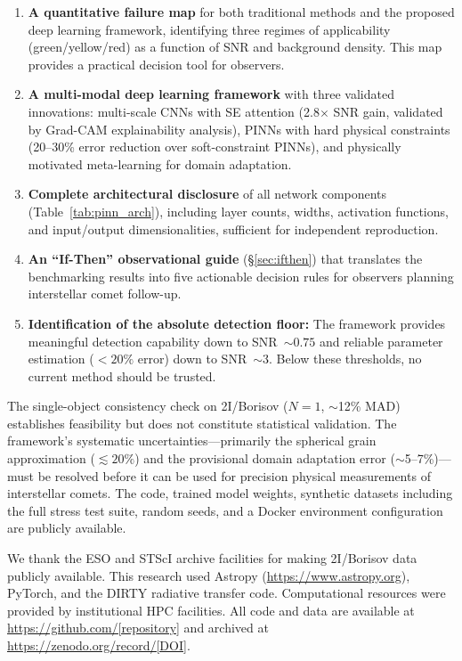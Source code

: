\documentclass[preprint2]{aastex631}
\begin{document}
\begin{enumerate}
    \item \textbf{A quantitative failure map} for both traditional methods and the proposed deep learning framework, identifying three regimes of applicability (green/yellow/red) as a function of SNR and background density. This map provides a practical decision tool for observers.
    \item \textbf{A multi-modal deep learning framework} with three validated innovations: multi-scale CNNs with SE attention (2.8$\times$ SNR gain, validated by Grad-CAM explainability analysis), PINNs with hard physical constraints (20--30\% error reduction over soft-constraint PINNs), and physically motivated meta-learning for domain adaptation.
    \item \textbf{Complete architectural disclosure} of all network components (Table~\ref{tab:pinn_arch}), including layer counts, widths, activation functions, and input/output dimensionalities, sufficient for independent reproduction.
    \item \textbf{An ``If-Then'' observational guide} (\S\ref{sec:ifthen}) that translates the benchmarking results into five actionable decision rules for observers planning interstellar comet follow-up.
    \item \textbf{Identification of the absolute detection floor:} The framework provides meaningful detection capability down to SNR~$\sim 0.75$ and reliable parameter estimation ($<20\%$ error) down to SNR~$\sim 3$. Below these thresholds, no current method should be trusted.
\end{enumerate}

The single-object consistency check on 2I/Borisov ($N=1$, $\sim$12\% MAD) establishes feasibility but does not constitute statistical validation. The framework's systematic uncertainties---primarily the spherical grain approximation ($\lesssim 20\%$) and the provisional domain adaptation error ($\sim$5--7\%)---must be resolved before it can be used for precision physical measurements of interstellar comets. The code, trained model weights, synthetic datasets including the full stress test suite, random seeds, and a Docker environment configuration are publicly available.

\begin{acknowledgments}
We thank the ESO and STScI archive facilities for making 2I/Borisov data publicly available. This research used Astropy (\url{https://www.astropy.org}), PyTorch, and the DIRTY radiative transfer code. Computational resources were provided by institutional HPC facilities. All code and data are available at \url{https://github.com/[repository]} and archived at \url{https://zenodo.org/record/[DOI]}.
\end{acknowledgments}
\end{document}
